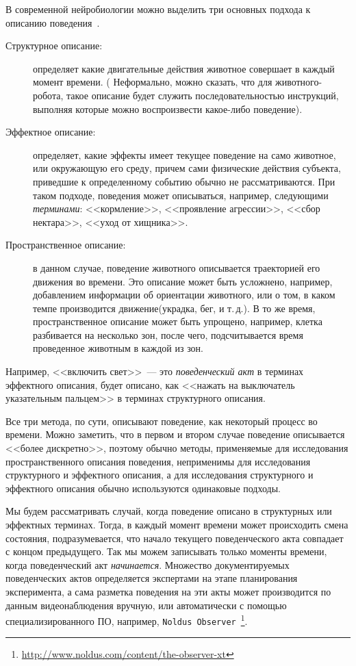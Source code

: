 \documentclass[12pt,fсeqn]{article}
\begin{document}
В современной нейробиологии можно выделить три основных подхода к описанию поведения~\cite[с.~57]{Martin_Bateson}.
\begin{description}
 \item[Структурное описание:] определяет какие двигательные действия животное совершает в каждый момент времени. ( Неформально, можно сказать, что
для животного-робота, такое описание будет служить последовательностью инструкций, выполняя которые можно воспроизвести
какое-либо поведение).
\item[Эффектное описание:] определяет, какие эффекты имеет текущее поведение на само животное, или окружающую его среду, причем
сами физические действия субъекта, приведшие к определенному событию обычно не рассматриваются. При таком
подходе, поведения может описываться, например, следующими {\em терминами}: <<кормление>>, <<проявление агрессии>>,
<<сбор нектара>>, <<уход от хищника>>.
\item[Пространственное описание:] в данном случае, поведение животного описывается траекторией его движения во времени.
Это описание может быть усложнено, например, добавлением информации об ориентации животного, или о том, в каком темпе
производится движение(украдка, бег, и т.\,д.). В то же время, пространственное описание может быть упрощено, например,
клетка разбивается на несколько зон, после чего, подсчитывается время проведенное животным в каждой из зон.
\end{description}
 
Например, <<включить свет>>~--- это {\em поведенческий акт} в терминах эффектного описания, будет описано, как <<нажать на выключатель указательным пальцем>>
в терминах структурного описания.
 
Все три метода, по сути, описывают поведение, как некоторый процесс во времени. Можно заметить, что в первом и втором
случае поведение описывается <<более дискретно>>, поэтому обычно методы, применяемые для исследования пространственного описания
поведения, неприменимы для исследования структурного и эффектного описания, а для исследования структурного и эффектного описания
обычно используются одинаковые подходы.
 
Мы будем рассматривать случай, когда поведение описано в структурных или эффектных терминах. Тогда, в каждый момент
времени может происходить смена состояния, подразумевается, что начало текущего поведенческого акта совпадает
с концом предыдущего. Так мы можем записывать только моменты времени, когда поведенческий акт {\em начинается}.
Множество документируемых поведенческих актов определяется экспертами на этапе планирования эксперимента,
а сама разметка поведения на эти акты может производится по данным видеонаблюдения вручную, или
автоматически с помощью специализированного ПО, например, \verb!Noldus Observer!~\footnote{ \url{http://www.noldus.com/content/the-observer-xt}}.
\end{document}

